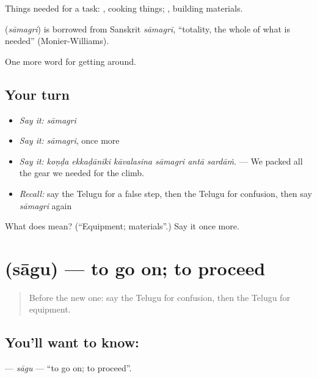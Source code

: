 Things needed for a task:  , cooking things;  , building materials.

\begin{cousinweb}
\textbf{} (\emph{sāmagri}) is borrowed from Sanskrit \emph{sāmagrī}, \textquotedblleft{}totality, the whole of what is needed\textquotedblright{} (Monier-Williams).
\end{cousinweb}

\begin{grammarlens}[title={What you've built}]
One more word for getting around.
\end{grammarlens}

\subsection*{Your turn}
\begin{itemize}
\raggedright
  \item \emph{Say it:} \emph{sāmagri}
  \item \emph{Say it:} \emph{sāmagri}, once more
  \item \emph{Say it:} \emph{koṇḍa ekkaḍāniki kāvalasina sāmagri antā sardāṁ.} — We packed all the gear we needed for the climb.
  \item \emph{Recall:} say the Telugu for a false step, then the Telugu for confusion, then say \emph{sāmagri} again
\end{itemize}

\begin{tcolorbox}[breakable,colback=teal!4,colframe=teal!35!black,title={Before you move on}]
What does  mean? (\textquotedblleft{}Equipment; materials\textquotedblright{}.) Say it once more.
\end{tcolorbox}
\section[\texorpdfstring{\te{సాగు} (sāgu)}{సాగు (sāgu)}]{ (sāgu) — to go on; to proceed}

\label{lesson:TE-C493-sagu}



\begin{quote}
Before the new one: say the Telugu for confusion, then the Telugu for equipment.
\end{quote}

\subsection*{You'll want to know: }
\textbf{} — \emph{sāgu} — \textquotedblleft{}to go on; to proceed\textquotedblright{}.

